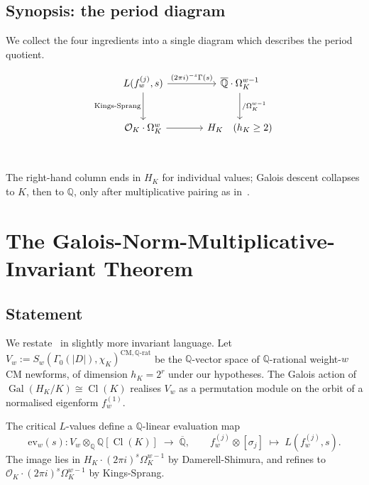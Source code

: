 \documentclass[11pt]{amsart}
\theoremstyle{definition}
\theoremstyle{remark}
\DeclareMathOperator{\Cl}{Cl}
\DeclareMathOperator{\Gal}{Gal}
\newcommand{\Q}{\mathbb{Q}}
\newcommand{\OK}{\mathcal{O}_K}
\newcommand{\HK}{H_K}
\newcommand{\chiK}{\chi_K}
\begin{document}
\subsection{Synopsis: the period diagram}\label{ss:diagram}
We collect the four ingredients into a single diagram which describes
the period quotient.

\begin{equation}\label{diag:period}
\begin{tikzcd}[row sep=large, column sep=large]
L(f_w^{(j)}, s)
\arrow[r, "{(2\pi i)^{-s} \Gamma(s)}"]
\arrow[d, "{\text{Kings-Sprang}}"']
& \overline{\Q} \cdot \Omega_K^{w-1}
\arrow[d, "{/ \Omega_K^{w-1}}"] \\
\OK \cdot \Omega_K^{w}
\arrow[r]
& \HK \quad (\text{$h_K \geq 2$})\\
\end{tikzcd}
\end{equation}
The right-hand column ends in $\HK$ for individual values;
Galois descent collapses to $K$, then to $\Q$, only after
multiplicative pairing as in~.

\section{The Galois-Norm-Multiplicative-Invariant Theorem}
\label{sec:T1-proof}

\subsection{Statement}\label{ss:T1-restate}
We restate~ in slightly more invariant language. Let
$V_w := S_w(\Gamma_0(|D|), \chiK)^{\mathrm{CM},\Q\text{-rat}}$ be the
$\Q$-vector space of $\Q$-rational weight-$w$ CM newforms, of dimension
$h_K = 2^r$ under our hypotheses. The Galois action of
$\Gal(\HK/K) \cong \Cl(K)$ realises $V_w$ as a permutation module on
the orbit of a normalised eigenform $f_w^{(1)}$.

The critical $L$-values define a $\Q$-linear evaluation map
\begin{equation}\label{eq:eval}
\mathrm{ev}_w(s) : V_w \otimes_\Q \Q[\Cl(K)] \;\longrightarrow\;
\overline{\Q}, \qquad
f_w^{(j)} \otimes [\sigma_j] \;\longmapsto\; L(f_w^{(j)}, s).
\end{equation}
The image lies in $\HK \cdot (2\pi i)^s \Omega_K^{w-1}$ by Damerell-Shimura,
and refines to $\OK \cdot (2\pi i)^s \Omega_K^{w-1}$ by Kings-Sprang.
\end{document}
